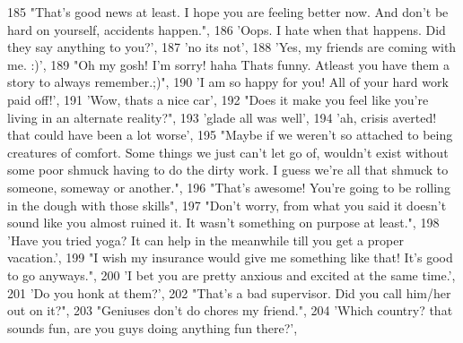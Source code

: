 \begin{DoxyCode}
185                             \textcolor{stringliteral}{"That's good news at least. I hope you are feeling better now. And don't be
       hard on yourself, accidents happen."},
186                             \textcolor{stringliteral}{'Oops. I hate when that happens. Did they say anything to you?'},
187                             \textcolor{stringliteral}{'no its not'},
188                             \textcolor{stringliteral}{'Yes, my friends are coming with me. :)'},
189                             \textcolor{stringliteral}{"Oh my gosh! I'm sorry! haha Thats funny. Atleast you have them a story to
       always remember.;)"},
190                             \textcolor{stringliteral}{'I am so happy for you! All of your hard work paid off!'},
191                             \textcolor{stringliteral}{'Wow, thats a nice car'},
192                             \textcolor{stringliteral}{"Does it make you feel like you're living in an alternate reality?"},
193                             \textcolor{stringliteral}{'glade all was well'},
194                             \textcolor{stringliteral}{'ah, crisis averted! that could have been a lot worse'},
195                             \textcolor{stringliteral}{"Maybe if we weren't so attached to being creatures of comfort. Some things we
       just can't let go of, wouldn't exist without some poor shmuck having to do the dirty work. I guess we're all
       that shmuck to someone, someway or another."},
196                             \textcolor{stringliteral}{"That's awesome! You're going to be rolling in the dough with those skills"},
197                             \textcolor{stringliteral}{"Don't worry, from what you said it doesn't sound like you almost ruined it. It
       wasn't something on purpose at least."},
198                             \textcolor{stringliteral}{'Have you tried yoga? It can help in the meanwhile till you get a proper
       vacation.'},
199                             \textcolor{stringliteral}{"I wish my insurance would give me something like that! It's good to go
       anyways."},
200                             \textcolor{stringliteral}{'I bet you are pretty anxious and excited at the same time.'},
201                             \textcolor{stringliteral}{'Do you honk at them?'},
202                             \textcolor{stringliteral}{"That's a bad supervisor. Did you call him/her out on it?"},
203                             \textcolor{stringliteral}{"Geniuses don't do chores my friend."},
204                             \textcolor{stringliteral}{'Which country? that sounds fun, are you guys doing anything fun there?'},

\end{DoxyCode}
